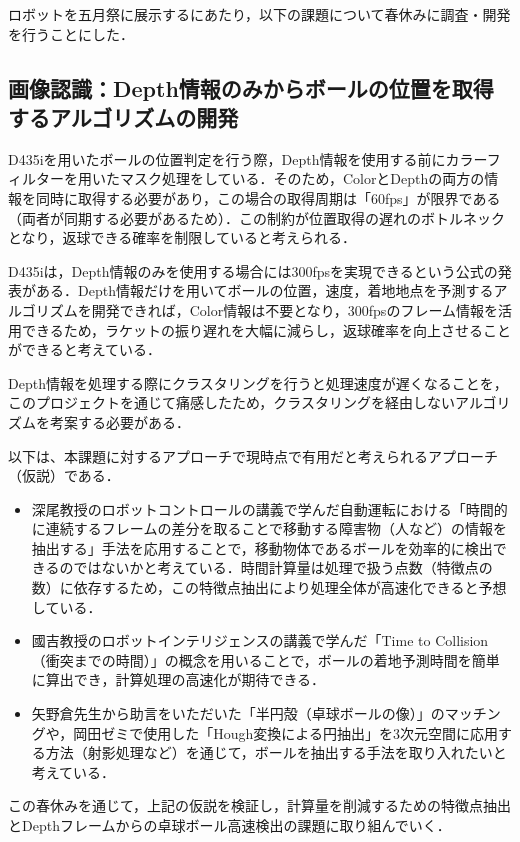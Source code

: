 \documentclass[10pt, oneside, titlepage]{ltjarticle}  %
\begin{document}
ロボットを五月祭に展示するにあたり，以下の課題について春休みに調査・開発を行うことにした．
\subsection{画像認識：Depth情報のみからボールの位置を取得するアルゴリズムの開発}
D435iを用いたボールの位置判定を行う際，Depth情報を使用する前にカラーフィルターを用いたマスク処理をしている．そのため，ColorとDepthの両方の情報を同時に取得する必要があり，この場合の取得周期は「60fps」が限界である（両者が同期する必要があるため）．この制約が位置取得の遅れのボトルネックとなり，返球できる確率を制限していると考えられる．

D435iは，Depth情報のみを使用する場合には300fpsを実現できるという公式の発表がある\cite{intel}．Depth情報だけを用いてボールの位置，速度，着地地点を予測するアルゴリズムを開発できれば，Color情報は不要となり，300fpsのフレーム情報を活用できるため，ラケットの振り遅れを大幅に減らし，返球確率を向上させることができると考えている．

Depth情報を処理する際にクラスタリングを行うと処理速度が遅くなることを，このプロジェクトを通じて痛感したため，クラスタリングを経由しないアルゴリズムを考案する必要がある．

以下は、本課題に対するアプローチで現時点で有用だと考えられるアプローチ（仮説）である．

\begin{itemize}
\item 深尾教授のロボットコントロールの講義で学んだ自動運転における「時間的に連続するフレームの差分を取ることで移動する障害物（人など）の情報を抽出する」手法を応用することで，移動物体であるボールを効率的に検出できるのではないかと考えている．時間計算量は処理で扱う点数（特徴点の数）に依存するため，この特徴点抽出により処理全体が高速化できると予想している．

\item 國吉教授のロボットインテリジェンスの講義で学んだ「Time to Collision（衝突までの時間）」の概念を用いることで，ボールの着地予測時間を簡単に算出でき，計算処理の高速化が期待できる．

\item 矢野倉先生から助言をいただいた「半円殻（卓球ボールの像）」のマッチングや，岡田ゼミで使用した「Hough変換による円抽出」を3次元空間に応用する方法（射影処理など）を通じて，ボールを抽出する手法を取り入れたいと考えている．
\end{itemize}

この春休みを通じて，上記の仮説を検証し，計算量を削減するための特徴点抽出とDepthフレームからの卓球ボール高速検出の課題に取り組んでいく．
\end{document}
